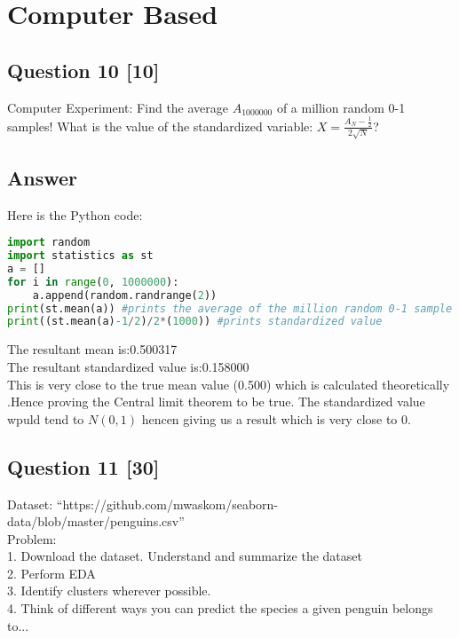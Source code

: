\documentclass[12pt]{article}
\begin{document}
\section{Computer Based}
\subsection*{Question 10 [10]}
Computer Experiment: Find the average  \( A_{1000000} \) of a million random 0-1 samples! What is the value of the standardized variable:
$  X = \frac{A_N - \frac{1}{2}} {2 \sqrt{N}}$?
\subsection{Answer}
Here is the Python code:

\begin{lstlisting}[language=Python]
import random
import statistics as st
a = []
for i in range(0, 1000000):
    a.append(random.randrange(2))
print(st.mean(a)) #prints the average of the million random 0-1 sample
print((st.mean(a)-1/2)/2*(1000)) #prints standardized value 

\end{lstlisting}
The resultant mean is:0.500317 \\
The resultant standardized value is:0.158000\\
This is very close to the  true mean value (0.500) which is calculated theoretically .Hence proving the Central limit theorem to be true. The standardized value wpuld tend to \( N(0,  1 )\) hencen giving us a result which is very close to 0.



\subsection*{Question 11 [30]}
Dataset: ``https://github.com/mwaskom/seaborn-data/blob/master/penguins.csv''\\
Problem:\\
1. Download the dataset. Understand and summarize the dataset\\
2. Perform EDA\\
3. Identify clusters wherever possible.\\
4. Think of different ways you can predict the species a given penguin belongs to...
\end{document}
